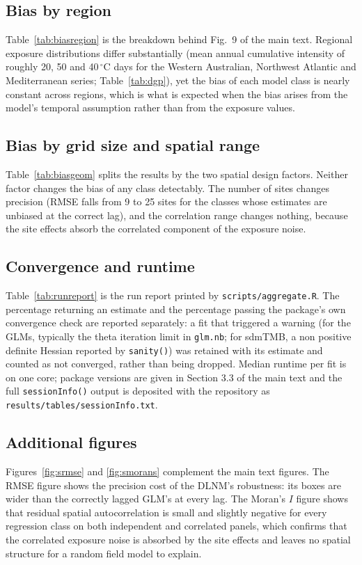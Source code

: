 \documentclass[11pt,a4paper]{article}
\begin{document}
\subsection{Bias by region}
Table~\ref{tab:biasregion} is the breakdown behind Fig.~9 of the main text. Regional exposure distributions differ substantially (mean annual cumulative intensity of roughly 20, 50 and 40\,$^{\circ}$C days for the Western Australian, Northwest Atlantic and Mediterranean series; Table~\ref{tab:dgp}), yet the bias of each model class is nearly constant across regions, which is what is expected when the bias arises from the model's temporal assumption rather than from the exposure values.
\biasByRegionTable

\subsection{Bias by grid size and spatial range}
Table~\ref{tab:biasgeom} splits the results by the two spatial design factors. Neither factor changes the bias of any class detectably. The number of sites changes precision (RMSE falls from 9 to 25 sites for the classes whose estimates are unbiased at the correct lag), and the correlation range changes nothing, because the site effects absorb the correlated component of the exposure noise.
\biasByGeometryTable

\subsection{Convergence and runtime}
Table~\ref{tab:runreport} is the run report printed by \texttt{scripts/aggregate.R}. The percentage returning an estimate and the percentage passing the package's own convergence check are reported separately: a fit that triggered a warning (for the GLMs, typically the theta iteration limit in \texttt{glm.nb}; for sdmTMB, a non positive definite Hessian reported by \texttt{sanity()}) was retained with its estimate and counted as not converged, rather than being dropped. Median runtime per fit is on one core; package versions are given in Section 3.3 of the main text and the full \texttt{sessionInfo()} output is deposited with the repository as \texttt{results/tables/sessionInfo.txt}.
\runReportTable

\subsection{Additional figures}
Figures~\ref{fig:srmse} and \ref{fig:smorans} complement the main text figures. The RMSE figure shows the precision cost of the DLNM's robustness: its boxes are wider than the correctly lagged GLM's at every lag. The Moran's $I$ figure shows that residual spatial autocorrelation is small and slightly negative for every regression class on both independent and correlated panels, which confirms that the correlated exposure noise is absorbed by the site effects and leaves no spatial structure for a random field model to explain.
\end{document}
